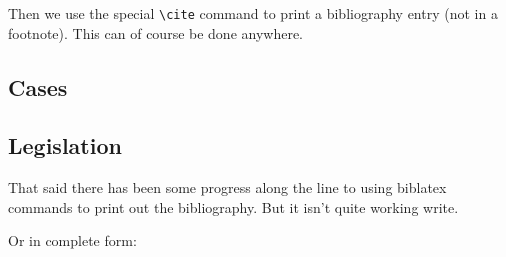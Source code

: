 \documentclass{nzlaw}
\begin{document}
Then we use the special \verb|\cite| command to print a bibliography
entry (not in a footnote). This can of course be done anywhere.

\subsection{Cases}

\cite{reekie}

\cite{mafart}

\cite{z}

\cite{astrazeneca}

\subsection{Legislation}
\cite{gaming}


That said there has been some progress along the line to using
biblatex commands to print out the bibliography. But it isn't 
quite working write.

\nocite{*}


Or in complete form:
\printbibliography
\end{document}
